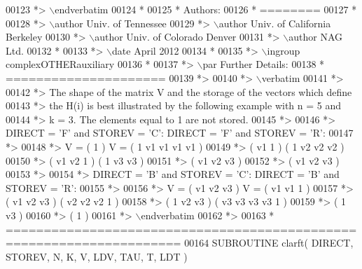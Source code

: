 \begin{DoxyCode}
00123 \textcolor{comment}{*> \(\backslash\)endverbatim}
00124 \textcolor{comment}{*}
00125 \textcolor{comment}{*  Authors:}
00126 \textcolor{comment}{*  ========}
00127 \textcolor{comment}{*}
00128 \textcolor{comment}{*> \(\backslash\)author Univ. of Tennessee }
00129 \textcolor{comment}{*> \(\backslash\)author Univ. of California Berkeley }
00130 \textcolor{comment}{*> \(\backslash\)author Univ. of Colorado Denver }
00131 \textcolor{comment}{*> \(\backslash\)author NAG Ltd. }
00132 \textcolor{comment}{*}
00133 \textcolor{comment}{*> \(\backslash\)date April 2012}
00134 \textcolor{comment}{*}
00135 \textcolor{comment}{*> \(\backslash\)ingroup complexOTHERauxiliary}
00136 \textcolor{comment}{*}
00137 \textcolor{comment}{*> \(\backslash\)par Further Details:}
00138 \textcolor{comment}{*  =====================}
00139 \textcolor{comment}{*>}
00140 \textcolor{comment}{*> \(\backslash\)verbatim}
00141 \textcolor{comment}{*>}
00142 \textcolor{comment}{*>  The shape of the matrix V and the storage of the vectors which define}
00143 \textcolor{comment}{*>  the H(i) is best illustrated by the following example with n = 5 and}
00144 \textcolor{comment}{*>  k = 3. The elements equal to 1 are not stored.}
00145 \textcolor{comment}{*>}
00146 \textcolor{comment}{*>  DIRECT = 'F' and STOREV = 'C':         DIRECT = 'F' and STOREV = 'R':}
00147 \textcolor{comment}{*>}
00148 \textcolor{comment}{*>               V = (  1       )                 V = (  1 v1 v1 v1 v1 )}
00149 \textcolor{comment}{*>                   ( v1  1    )                     (     1 v2 v2 v2 )}
00150 \textcolor{comment}{*>                   ( v1 v2  1 )                     (        1 v3 v3 )}
00151 \textcolor{comment}{*>                   ( v1 v2 v3 )}
00152 \textcolor{comment}{*>                   ( v1 v2 v3 )}
00153 \textcolor{comment}{*>}
00154 \textcolor{comment}{*>  DIRECT = 'B' and STOREV = 'C':         DIRECT = 'B' and STOREV = 'R':}
00155 \textcolor{comment}{*>}
00156 \textcolor{comment}{*>               V = ( v1 v2 v3 )                 V = ( v1 v1  1       )}
00157 \textcolor{comment}{*>                   ( v1 v2 v3 )                     ( v2 v2 v2  1    )}
00158 \textcolor{comment}{*>                   (  1 v2 v3 )                     ( v3 v3 v3 v3  1 )}
00159 \textcolor{comment}{*>                   (     1 v3 )}
00160 \textcolor{comment}{*>                   (        1 )}
00161 \textcolor{comment}{*> \(\backslash\)endverbatim}
00162 \textcolor{comment}{*>}
00163 \textcolor{comment}{*  =====================================================================}
00164 \textcolor{keyword}{      SUBROUTINE }clarft( DIRECT, STOREV, N, K, V, LDV, TAU, T, LDT )

\end{DoxyCode}
